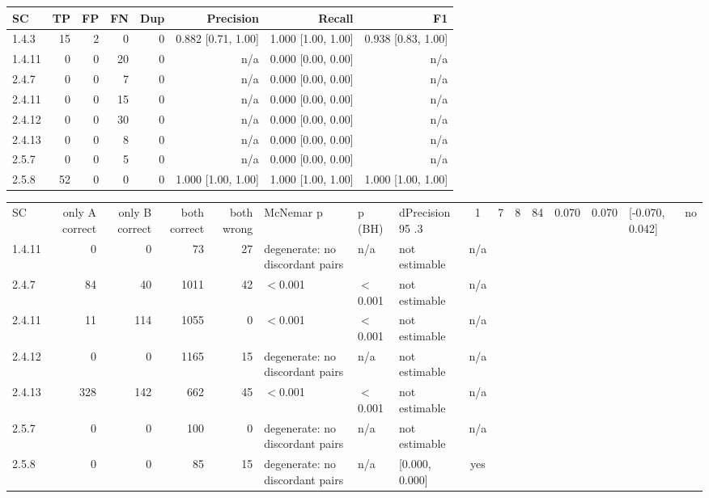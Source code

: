 \begin{tabular}{lrrrrrrr}
\hline
SC & TP & FP & FN & Dup & Precision & Recall & F1 \\
\hline
1.4.3 & 15 & 2 & 0 & 0 & 0.882 [0.71, 1.00] & 1.000 [1.00, 1.00] & 0.938 [0.83, 1.00] \\
1.4.11 & 0 & 0 & 20 & 0 & n/a & 0.000 [0.00, 0.00] & n/a \\
2.4.7 & 0 & 0 & 7 & 0 & n/a & 0.000 [0.00, 0.00] & n/a \\
2.4.11 & 0 & 0 & 15 & 0 & n/a & 0.000 [0.00, 0.00] & n/a \\
2.4.12 & 0 & 0 & 30 & 0 & n/a & 0.000 [0.00, 0.00] & n/a \\
2.4.13 & 0 & 0 & 8 & 0 & n/a & 0.000 [0.00, 0.00] & n/a \\
2.5.7 & 0 & 0 & 5 & 0 & n/a & 0.000 [0.00, 0.00] & n/a \\
2.5.8 & 52 & 0 & 0 & 0 & 1.000 [1.00, 1.00] & 1.000 [1.00, 1.00] & 1.000 [1.00, 1.00] \\
\hline
\end{tabular}

\begin{tabular}{lrrrrlllc}
\hline
SC & only A correct & only B correct & both correct & both wrong & McNemar p & p (BH) & dPrecision 95%
.3 & 1 & 7 & 8 & 84 & 0.070 & 0.070 & [-0.070, 0.042] & no \\
1.4.11 & 0 & 0 & 73 & 27 & degenerate: no discordant pairs & n/a & not estimable & n/a \\
2.4.7 & 84 & 40 & 1011 & 42 & $<$0.001 & $<$0.001 & not estimable & n/a \\
2.4.11 & 11 & 114 & 1055 & 0 & $<$0.001 & $<$0.001 & not estimable & n/a \\
2.4.12 & 0 & 0 & 1165 & 15 & degenerate: no discordant pairs & n/a & not estimable & n/a \\
2.4.13 & 328 & 142 & 662 & 45 & $<$0.001 & $<$0.001 & not estimable & n/a \\
2.5.7 & 0 & 0 & 100 & 0 & degenerate: no discordant pairs & n/a & not estimable & n/a \\
2.5.8 & 0 & 0 & 85 & 15 & degenerate: no discordant pairs & n/a & [0.000, 0.000] & yes \\
\hline
\end{tabular}

